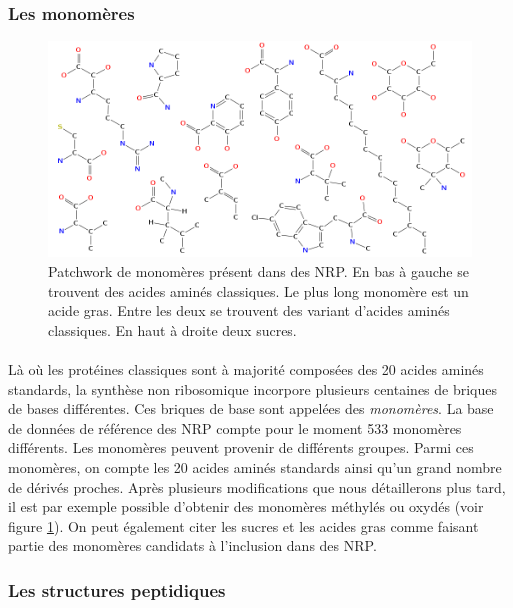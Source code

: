 \documentclass[12pt,french,twoside]{report}
\begin{document}
\subsubsection{Les monomères}

\begin{figure}[h!]
  \begin{center}
    \includegraphics[width=450px]{Figures/bio/Intro/monos/monos.png}
    \caption{\label{monomers_example}Patchwork de monomères présent dans des NRP.
    En bas à gauche se trouvent des acides aminés classiques.
    Le plus long monomère est un acide gras.
    Entre les deux se trouvent des variant d'acides aminés classiques.
    En haut à droite deux  sucres.}
  \end{center}
\end{figure}

\paragraph{}Là où les protéines classiques sont à majorité composées des 20 acides aminés standards, la synthèse non ribosomique incorpore plusieurs centaines de briques de bases différentes.
Ces briques de base sont appelées des {\em monomères}.
La base de données de référence des NRP compte pour le moment 533 monomères différents.
Les monomères peuvent provenir de différents groupes.
Parmi ces monomères, on compte les 20 acides aminés standards ainsi qu'un grand nombre de dérivés proches.
Après plusieurs modifications que nous détaillerons plus tard, il est par exemple possible d'obtenir des monomères méthylés ou oxydés (voir figure \ref{monomers_example}).
On peut également citer les sucres et les acides gras comme faisant partie des monomères candidats à l'inclusion dans des NRP.


\subsubsection{Les structures peptidiques}
\end{document}
